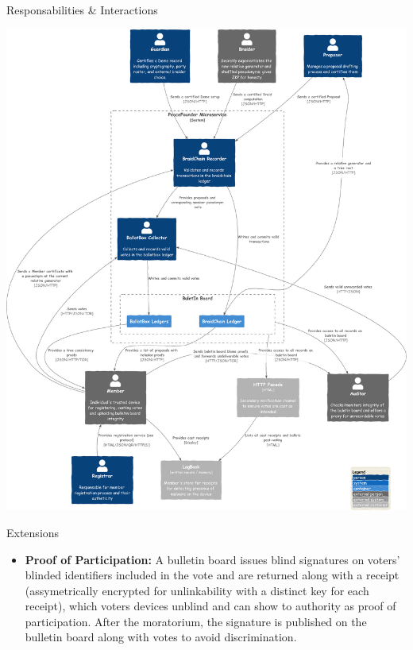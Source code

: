 \documentclass[final]{beamer}
\newlength{\colwidth}
\begin{document}
\begin{frame}[t]
\begin{columns}[t]
\begin{column}{\colwidth}
\begin{block}{Responsabilities \& Interactions}
    \begin{center}
      \includegraphics[width=\colwidth]{figures/model-responsabilities.pdf}  
      \vspace{-2cm}
    \end{center}
    
  \end{block}

  \begin{block}{Extensions}

    \begin{itemize}
    \item \textbf{Proof of Participation:} A bulletin board issues blind signatures on voters’ blinded identifiers included in the vote and are returned along with a receipt (assymetrically encrypted for unlinkability with a distinct key for each receipt), which voters devices unblind and can show to authority as proof of participation. After the moratorium, the signature is published on the bulletin board along with votes to avoid discrimination.
      
      \vspace{0.5em}
      

\end{itemize}
\end{block}
\end{column}
\end{columns}
\end{frame}
\end{document}
